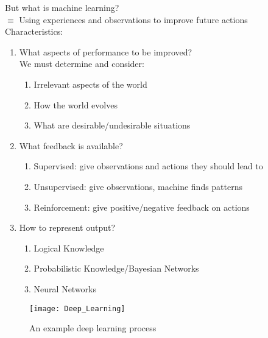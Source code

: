 \documentclass[../../lecture_notes.tex]{subfiles}
\begin{document}
\noindent But what is machine learning?\\
\indent $\equiv$ Using experiences and observations to improve future actions\\
\indent Characteristics:
	\begin{enumerate} [itemsep=0mm]
		\item What aspects of performance to be improved?\\
			We must determine and consider:
			\begin{enumerate} [itemsep=0mm]
				\item Irrelevant aspects of the world
				\item How the world evolves
				\item What are desirable/undesirable situations
			\end{enumerate}
		\item What feedback is available?
			\begin{enumerate} [itemsep=0mm]
				\item Supervised: give observations and actions they should lead to
				\item Unsupervised: give observations, machine finds patterns
				\item Reinforcement: give positive/negative feedback on actions
			\end{enumerate}
		\item How to represent output?
			\begin{enumerate} [itemsep=0mm]
				\item Logical Knowledge
				\item Probabilistic Knowledge/Bayesian Networks
				\item Neural Networks
			\end{enumerate}
	\end{enumerate} \medskip
	
\begin{figure}[H]
	\centering
	\texttt{[image: Deep\_Learning]}
	\caption{An example deep learning process}
\end{figure}
\end{document}
